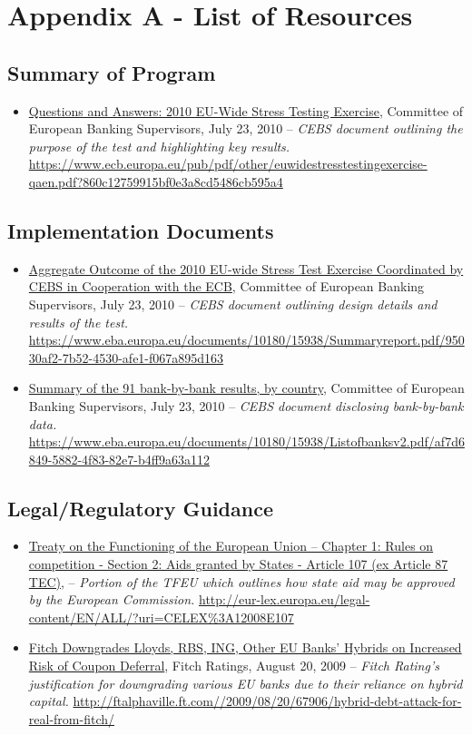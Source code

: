 \documentclass[12pt]{article}
\begin{document}
\section{Appendix A - List of Resources}

\subsection{Summary of Program}

\begin{itemize}
\item
\ul{Questions and Answers: 2010 EU-Wide Stress Testing Exercise}, Committee of European Banking Supervisors, July 23, 2010 -- \emph{CEBS
 document outlining the purpose of the test and highlighting key results.} \url{https://www.ecb.europa.eu/pub/pdf/other/euwidestresstestingexercise-qaen.pdf?860c12759915bf0e3a8cd5486cb595a4}
\end{itemize}

\subsection{Implementation Documents}
\begin{itemize}
\item
\ul{Aggregate Outcome of the 2010 EU-wide Stress Test Exercise Coordinated by CEBS in Cooperation with the ECB}, Committee of European Banking Supervisors, July 23, 2010 -- \emph{CEBS
 document outlining design details and results of the test.} \url{https://www.eba.europa.eu/documents/10180/15938/Summaryreport.pdf/95030af2-7b52-4530-afe1-f067a895d163}
\item
\ul{Summary of the 91 bank-by-bank results, by country}, Committee of European Banking Supervisors, July 23, 2010 -- \emph{CEBS
 document disclosing bank-by-bank data.} \url{https://www.eba.europa.eu/documents/10180/15938/Listofbanksv2.pdf/af7d6849-5882-4f83-82e7-b4ff9a63a112}
\end{itemize}

\subsection{Legal/Regulatory Guidance}

\begin{itemize}
\item
\ul{Treaty on the Functioning of the European Union -- Chapter 1: Rules on competition - Section 2: Aids granted by States - Article 107 (ex Article 87 TEC)}, -- \emph{Portion of the TFEU which outlines how state aid may be approved by the European Commission.} \url{http://eur-lex.europa.eu/legal-content/EN/ALL/?uri=CELEX\%3A12008E107}
\item
\ul{Fitch Downgrades Lloyds, RBS, ING, Other EU Banks' Hybrids on Increased Risk of Coupon Deferral}, Fitch Ratings, August 20, 2009 -- \emph{Fitch Rating's justification for downgrading various EU banks due to their reliance on hybrid capital.} \url{http://ftalphaville.ft.com//2009/08/20/67906/hybrid-debt-attack-for-real-from-fitch/}
\end{itemize}
\end{document}
